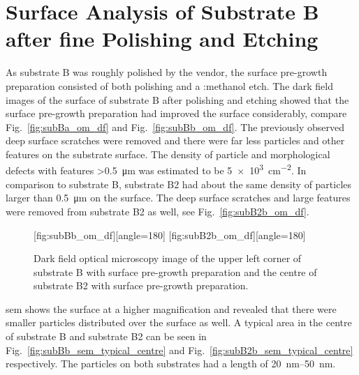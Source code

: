 \clearpage
   
\section{Surface Analysis of Substrate B after fine Polishing and Etching}

As substrate B was roughly polished by the vendor, the surface pre-growth preparation consisted of both polishing and a :methanol etch. The dark field images of the surface of substrate B after polishing and etching showed that the surface pre-growth preparation had improved the surface considerably, compare Fig.~\ref{fig:subBa_om_df} and Fig.~\ref{fig:subBb_om_df}. The previously observed deep surface scratches were removed and there were far less particles and other features on the substrate surface. The density of particle and morphological defects with features \SI{>0.5}{\micro\metre} was estimated to be \SI{5e3}{\centi\metre^{-2}}. In comparison to substrate B, substrate B2 had about the same density of particles larger than \SI{0.5}{\micro\metre} on the surface. The deep surface scratches and large features were removed from substrate B2 as well, see Fig.~\ref{fig:subB2b_om_df}.

\begin{figure}[htbp]
    \centering
    [fig:subBb_om_df][angle=180]
    \hfill%
    [fig:subB2b_om_df][angle=180]
    \caption[Dark field optical microscopy image of substrate B and B2 with surface pre-growth preparation.]{Dark field optical microscopy image of  the upper left corner of substrate B with surface pre-growth preparation and  the centre of substrate B2 with surface pre-growth preparation.}\label{fig:subBb_and_subB2b_om_df}
\end{figure}

\Ac{sem} shows the surface at a higher magnification and revealed that there were smaller particles distributed over the surface as well. A typical area in the centre of substrate B and substrate B2 can be seen in Fig.~\ref{fig:subBb_sem_typical_centre} and Fig.~\ref{fig:subB2b_sem_typical_centre} respectively. The particles on both substrates had a length of \SIrange{20}{50}{\nano\metre}. 

